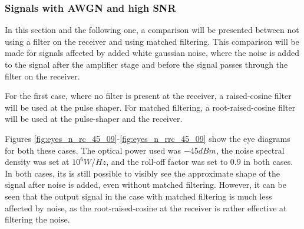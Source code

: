 \subsubsection*{Signals with AWGN and high SNR}

In this section and the following one, a comparison will be presented between
not using a filter on the receiver and using matched filtering. This comparison
will be made for signals affected by added white gaussian noise, where the
noise is added to the signal after the amplifier stage and before the signal
passes through the filter on the receiver.

For the first case, where no filter is present at the receiver, a
raised-cosine filter will be used at the pulse shaper. For matched filtering, a
root-raised-cosine filter will be used at the pulse-shaper and the receiver.

Figures \ref{fig:eyes_n_rc_45_09}-\ref{fig:eyes_n_rrc_45_09} show the eye
diagrams for both these cases. The optical power used was $-45 dBm$, the
noise spectral density was set at $10^6 W/Hz$, and the roll-off factor was set
to $0.9$ in both cases. In both cases, its is still possible to visibly see the
approximate shape of the signal after noise is added, even without matched
filtering. However, it can be seen that the output signal in the case with
matched filtering is much less affected by noise, as the root-raised-cosine at
the receiver is rather effective at filtering the noise.


